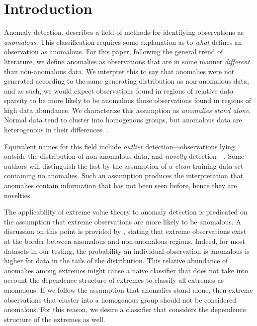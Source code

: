 \section{Introduction}



Anomaly detection, describes a field of methods for identifying observations as 
    \emph{anomalous}. This classification requires some explanation as to 
    \emph{what} defines an observation as anomalous. For this paper, following 
    the general trend of literature, we define anomalies as observations that 
    are in some manner \emph{different} than non-anomalous data. We interpret 
    this to say that anomalies were not generated according to the same generating 
    distribution as non-anomalous data, and as such, we would expect observations 
    found in regions of relative data sparsity to be more likely to be anomalous 
    those observations found in regions of high data abundance.  We characterize 
    this assumption as \emph{anomalies stand alone}.  Normal data tend to cluster 
    into homogenous groups, but anomalous data are heterogenous in their differences.
    .

Equivalent names for this field include \emph{outlier} detection---observations lying outside the
    distribution of non-anomalous data, and \emph{novelty} detection---.  Some authors will
    distinguish the last by the assumption of a \emph{clean} training data set containing no anomalies.  Such
    an assumption produces the interpretation that anomalies contain information that has not been seen before,
    hence they are novelties.

The applicability of extreme value theory to anomaly detection is predicated on the assumption that
    extreme observations are more likely to be anomalous.  A discussion on this point is provided by
    \cite{goix2017}, stating that extreme observations exist at the border between anomalous and 
    non-anomalous regions.  Indeed, for most datasets in our testing, the probability an individual 
    observation is anomalous is higher
  for data in the tails of the distribution. This relative abundance of anomalies among extremes might 
  cause a naive classifier that does not take into account the dependence structure of extremes to 
  classify all extremes as anomalous.  If we follow the assumption that anomalies stand alone, then extreme
  observations that cluster into a homogenous group should not be considered anomalous.  For this reason, we
  desire a classifier that considers the dependence structure of the extremes as well.

